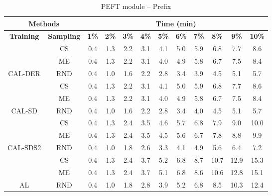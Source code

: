 \begin{table}[htbp]
\begin{subtable}{\linewidth}
\begin{tabular}{c|c|cccccccccc}
\toprule
\multicolumn{2}{c|}{\textbf{Methods}} & \multicolumn{10}{c}{\textbf{Time (min)}} \\
\midrule
\textbf{Training} & \textbf{Sampling} & \textbf{1\%} & \textbf{2\%} & \textbf{3\%} & \textbf{4\%} & \textbf{5\%} & \textbf{6\%} & \textbf{7\%} & \textbf{8\%} & \textbf{9\%} & \textbf{10\%}\\
\midrule
 & CS & 0.4 & 1.3 & 2.2 & 3.1 & 4.1 & 5.0 & 5.9 & 6.8 & 7.7 & 8.6\\

 & ME & 0.4 & 1.3 & 2.2 & 3.1 & 4.0 & 4.9 & 5.8 & 6.7 & 7.5 & 8.4\\

\multirow{-3}{*}{\raggedright\arraybackslash CAL-DER} & RND & 0.4 & 1.0 & 1.6 & 2.2 & 2.8 & 3.4 & 3.9 & 4.5 & 5.1 & 5.7\\
\midrule
 & CS & 0.4 & 1.3 & 2.2 & 3.1 & 4.1 & 5.0 & 5.9 & 6.8 & 7.7 & 8.6\\

 & ME & 0.4 & 1.3 & 2.2 & 3.1 & 4.0 & 4.9 & 5.8 & 6.7 & 7.5 & 8.4\\

\multirow{-3}{*}{\raggedright\arraybackslash CAL-SD} & RND & 0.4 & 1.0 & 1.6 & 2.2 & 2.8 & 3.4 & 4.0 & 4.5 & 5.1 & 5.7\\
\midrule
 & CS & 0.4 & 1.3 & 2.4 & 3.5 & 4.6 & 5.7 & 6.8 & 7.9 & 9.0 & 10.0\\

 & ME & 0.4 & 1.3 & 2.4 & 3.5 & 4.5 & 5.6 & 6.7 & 7.8 & 8.8 & 9.9\\

\multirow{-3}{*}{\raggedright\arraybackslash CAL-SDS2} & RND & 0.4 & 1.0 & 1.8 & 2.6 & 3.3 & 4.1 & 4.9 & 5.6 & 6.4 & 7.2\\
\midrule
 & CS & 0.4 & 1.3 & 2.4 & 3.7 & 5.2 & 6.8 & 8.7 & 10.7 & 12.9 & 15.3\\

 & ME & 0.4 & 1.3 & 2.4 & 3.7 & 5.1 & 6.8 & 8.6 & 10.6 & 12.8 & 15.1\\

\multirow{-3}{*}{\raggedright\arraybackslash AL} & RND & 0.4 & 1.0 & 1.8 & 2.8 & 3.9 & 5.2 & 6.8 & 8.5 & 10.3 & 12.4\\
\bottomrule
\end{tabular}
\end{subtable}
\vspace{1em}
\begin{subtable}{\linewidth}
\centering
\caption{PEFT module -- Prefix}


\end{subtable}
\end{table}
